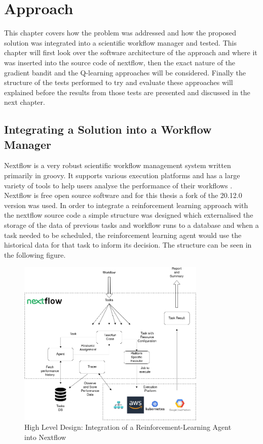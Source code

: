 
\cleardoublepage
\chapter{Approach}
\label{cha:approach}


This chapter covers how the problem was addressed and how the proposed solution was integrated into a scientific workflow manager and tested. This chapter will first look over the software architecture of the approach and where it was inserted into the source code of nextflow, then the exact nature of the gradient bandit and the Q-learning approaches will be considered. Finally the structure of the tests performed to try and evaluate these approaches will explained before the results from those tests are presented and discussed in the next chapter. 

\section{Integrating a Solution into a Workflow Manager}
\label{sec:integration}

Nextflow is a very robust scientific  workflow management system written primarily in groovy. It supports various execution platforms and has a large variety of tools to help users analyse the performance of their workflows \cite{TracingAndVisualisation}. Nextflow is free open source software and for this thesis a fork of the 20.12.0 version was used. In order to integrate a reinforcement learning approach with the nextflow source code a simple structure was designed which externalised the storage of the data of previous tasks and workflow runs to a database and when a task needed to be scheduled, the reinforcement learning agent would use the historical data for that task to inform its decision. The structure can be seen in the following figure.

\begin{figure}[ht]
    \centering
        \includegraphics[width=0.8\textwidth]{fig/implementation_diagram.png}
        \caption{High Level Design: Integration of a Reinforcement-Learning Agent into Nextflow}
        \label{fig:implementation}
\end{figure}

